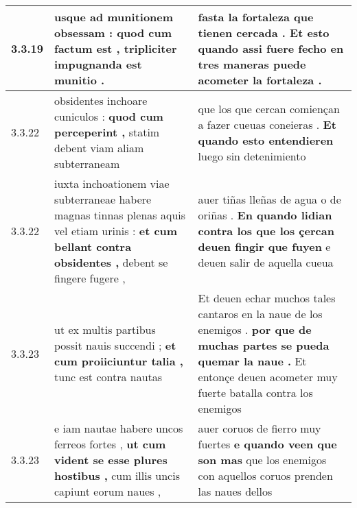 \begin{tabular}{|p{1cm}|p{6.5cm}|p{6.5cm}|}
3.3.19 & usque ad munitionem obsessam : \textbf{ quod cum factum est , } tripliciter impugnanda est munitio . & fasta la fortaleza que tienen cercada . \textbf{ Et esto quando assi fuere fecho } en tres maneras puede acometer la fortaleza . \\\hline
3.3.22 & obsidentes inchoare cuniculos : \textbf{ quod cum perceperint , } statim debent viam aliam subterraneam & que los que cercan comiençan a fazer cueuas coneieras . \textbf{ Et quando esto entendieren } luego sin detenimiento \\\hline
3.3.22 & iuxta inchoationem viae subterraneae habere magnas tinnas plenas aquis vel etiam urinis : \textbf{ et cum bellant contra obsidentes , } debent se fingere fugere , & auer tiñas lleñas de agua o de oriñas . \textbf{ En quando lidian contra los que los çercan deuen fingir que fuyen } e deuen salir de aquella cueua \\\hline
3.3.23 & ut ex multis partibus possit nauis succendi ; \textbf{ et cum proiiciuntur talia , } tunc est contra nautas & Et deuen echar muchos tales cantaros en la naue de los enemigos . \textbf{ por que de muchas partes se pueda quemar la naue . } Et entonçe deuen acometer muy fuerte batalla contra los enemigos \\\hline
3.3.23 & e iam nautae habere uncos ferreos fortes , \textbf{ ut cum vident se esse plures hostibus , } cum illis uncis capiunt eorum naues , & auer coruos de fierro muy fuertes \textbf{ e quando veen que son mas } que los enemigos con aquellos coruos prenden las naues dellos \\\hline

\end{tabular}
